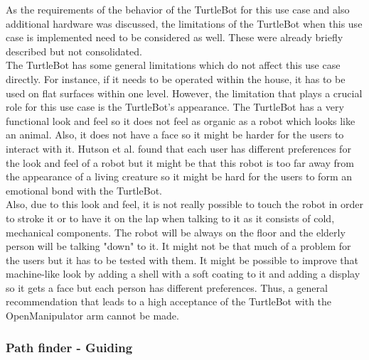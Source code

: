 \documentclass[plainarticle,zihtitle,english,final,hyperref,utf8]{zihpub}
\begin{document}
\bigskip
{}
\bigskip
As the requirements of the behavior of the TurtleBot for this use case and also additional hardware was discussed, the limitations of the TurtleBot when this use case is implemented need to be considered as well. These were already briefly described but not consolidated.\\
\newline
The TurtleBot has some general limitations which do not affect this use case directly. For instance, if it needs to be operated within the house, it has to be used on flat surfaces within one level. However, the limitation that plays a crucial role for this use case is the TurtleBot's appearance. The TurtleBot has a very functional look and feel so it does not feel as organic as a robot which looks like an animal. Also, it does not have a face so it might be harder for the users to interact with it. Hutson et al. \cite{hutson11} found that each user has different preferences for the look and feel of a robot but it might be that this robot is too far away from the appearance of a living creature so it might be hard for the users to form an emotional bond with the TurtleBot.\\
\newline
Also, due to this look and feel, it is not really possible to touch the robot in order to stroke it or to have it on the lap when talking to it as it consists of cold, mechanical components. The robot will be always on the floor and the elderly person will be talking "down" to it. It might not be that much of a problem for the users but it has to be tested with them. It might be possible to improve that machine-like look by adding a shell with a soft coating to it and adding a display so it gets a face but each person has different preferences. Thus, a general recommendation that leads to a high acceptance of the TurtleBot with the OpenManipulator arm cannot be made.\\

\newpage
\subsubsection{Path finder - Guiding}
\label{sec:guiding}

\end{document}
